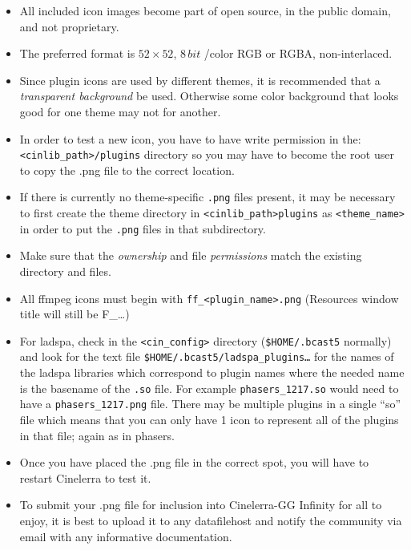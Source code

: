 \begin{itemize}
    \item All included icon images become part of open source, in the public domain, and not proprietary.
    \item The preferred format is $52 \times 52$, $8\,bit$ /color RGB or RGBA, non-interlaced.
    \item Since plugin icons are used by different themes, it is recommended that a \textit{transparent background} be used. Otherwise some color background that looks good for one theme may not for another.
    \item In order to test a new icon, you have to have write permission in the: \\ 
    \texttt{<cinlib\_path>/plugins} directory so you may have to become the root user to copy the .png file to the correct location.
    \item If there is currently no theme-specific \texttt{.png} files present, it may be necessary to first create the theme directory in \texttt{<cinlib\_path>plugins} as \texttt{<theme\_name>} in order to put the \texttt{.png} files in that subdirectory.
    \item Make sure that the \textit{ownership} and file \textit{permissions} match the existing directory and files.
    \item All ffmpeg icons must begin with \texttt{ff\_<plugin\_name>.png} (Resources window title will still be F\_\dots)
    \item For ladspa, check in the \texttt{<cin\_config>} directory (\texttt{\$HOME/.bcast5} normally) and look for the text file \texttt{\$HOME/.bcast5/ladspa\_plugins\dots} for the names of the ladspa libraries which correspond to plugin names where the needed name is the basename of the \texttt{.so} file. 
        For example \texttt{pha\-sers\_1217.so} would need to have a \texttt{phasers\_1217.png} file. There may be multiple plugins in a single “so” file which means that you can only have 1 icon to represent all of the plugins in that file; again as in phasers.
    \item Once you have placed the .png file in the correct spot, you will have to restart Cinelerra to test it.
    \item To submit your .png file for inclusion into Cinelerra-GG Infinity for all to enjoy, it is best to upload it to any datafilehost and notify the community via email with any informative documentation.
\end{itemize}

